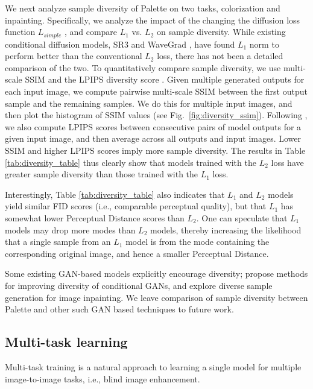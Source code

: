 We next analyze sample diversity of Palette on two tasks, colorization and inpainting. Specifically, we analyze the impact of the changing the diffusion loss function $L_{simple}$ \citep{ho2020denoising}, and compare $L_1$ vs. $L_2$ on sample diversity. While existing conditional diffusion models, SR3 \citep{saharia2021image} and WaveGrad \citep{chen-iclr-2021}, have found $L_{1}$ norm to perform better than the conventional $L_{2}$ loss, there has not been a detailed comparison of the two. To quantitatively compare sample diversity, we use multi-scale SSIM \cite{guadarrama2017pixcolor} and the  LPIPS diversity score \cite{zhu2017multimodal}. Given multiple generated outputs for each input image, we compute pairwise multi-scale SSIM between the first output sample and the remaining samples. We do this for multiple input images, and then plot the histogram of SSIM values (see Fig.\ \ref{fig:diversity_ssim}). 
Following  \cite{zhu2017multimodal}, we also compute LPIPS scores between consecutive pairs of model outputs for a given input image, and then average  across all outputs and input images. Lower SSIM and higher LPIPS scores imply more sample diversity. The results in Table \ref{tab:diversity_table} thus clearly show that models trained with the $L_2$ loss have greater sample diversity than those trained with the $L_1$ loss.

Interestingly,  Table \ref{tab:diversity_table} also indicates that $L_1$ and $L_2$ models yield similar FID scores (i.e.,  comparable perceptual quality), but that $L_1$ has somewhat lower  Perceptual Distance scores than $L_2$. One can speculate that $L_1$ models may drop more modes than $L_2$ models, thereby increasing the likelihood that  a single sample from an $L_1$ model is from the mode containing the corresponding original image, and hence a smaller Perceptual Distance.

Some existing GAN-based models explicitly encourage diversity;  \citep{zhu2017multimodal, yang2019diversity} propose methods for improving diversity of conditional GANs, and \citep{zhao2020uctgan, han2019finet} explore diverse sample generation for image inpainting. We leave comparison of sample diversity between Palette and other such GAN based techniques to future work.

\subsection{Multi-task learning}

Multi-task training is a natural approach to learning a single model for multiple image-to-image tasks, i.e., blind image enhancement.


